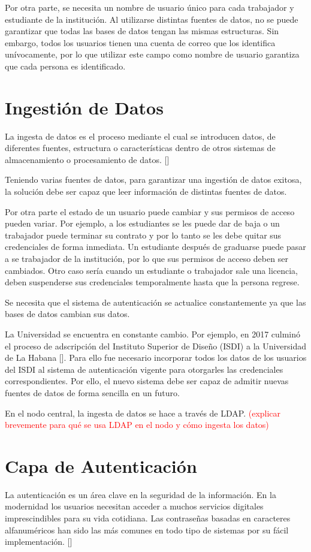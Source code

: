Por otra parte, se necesita un nombre de usuario único para cada trabajador y estudiante de la institución. Al utilizarse distintas fuentes de datos, no se puede garantizar que todas las bases de datos tengan las mismas estructuras. Sin embargo, todos los usuarios tienen una cuenta de correo que los identifica unívocamente, por lo que utilizar este campo como nombre de usuario garantiza que cada persona es identificado.

\section*{Ingestión de Datos}
La ingesta de datos es el proceso mediante el cual se introducen datos, de diferentes fuentes,
estructura o características dentro de otros sistemas de almacenamiento o procesamiento de
datos.  [\cite{fernandez2020aplicacion}]

Teniendo varias fuentes de datos, para garantizar una ingestión de datos exitosa, la solución debe ser capaz que leer información de distintas fuentes de datos. 

Por otra parte el estado de un usuario puede cambiar y sus permisos de acceso pueden variar. Por ejemplo, a los estudiantes se les puede dar de baja o un trabajador puede terminar su contrato y por lo tanto se les debe quitar sus credenciales de forma inmediata. Un estudiante después de graduarse puede pasar a se trabajador de la institución, por lo que sus permisos de acceso deben ser cambiados. Otro caso sería cuando un estudiante o trabajador sale una licencia, deben suspenderse sus credenciales temporalmente hasta que la persona regrese. 

Se necesita que el sistema de autenticación se actualice constantemente ya que las bases de datos cambian sus datos.

La Universidad  se encuentra en constante cambio. Por ejemplo, en 2017 culminó el proceso de adscripción del Instituto Superior de Diseño (ISDI) a la Universidad de La Habana [\cite{isdi-historia}]. Para ello fue necesario incorporar todos los datos de los usuarios del ISDI al sistema de autenticación vigente para otorgarles las credenciales correspondientes. Por ello, el nuevo sistema debe ser capaz de admitir nuevas fuentes de datos de forma sencilla en un futuro. 

En el nodo central, la ingesta de datos se hace a través de LDAP. \textcolor{red}{(explicar brevemente para qué se usa LDAP en el nodo y cómo ingesta los datos)}

\section*{Capa de Autenticación}
La autenticación es un área clave en la seguridad de la información. En la modernidad los usuarios necesitan acceder a muchos servicios digitales imprescindibles para su vida cotidiana. Las contraseñas basadas en caracteres alfanuméricos han sido las más comunes en todo tipo de sistemas por su fácil implementación. [\cite{rodriguez2018seguridad}]


